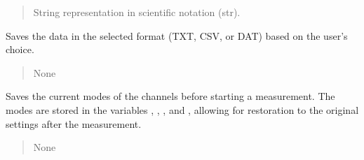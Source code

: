\documentclass[letterpaper,10pt,english]{sphinxmanual}
\begin{document}
\begin{fulllineitems}
\begin{fulllineitems}
\begin{quote}
\begin{description}
\sphinxAtStartPar
String representation in scientific notation (str).

\end{description}\end{quote}

\end{fulllineitems}


\begin{fulllineitems}
\label{\detokenize{FLIMGraphics:FLIMGraphics.FLIMGraphic.saveFLIMData}}
\pysigstartsignatures
{}
\pysigstopsignatures
\sphinxAtStartPar
Saves the data in the selected format (TXT, CSV, or DAT) based on the user’s choice.
\begin{quote}\begin{description}
\sphinxAtStartPar
None

\end{description}\end{quote}

\end{fulllineitems}


\begin{fulllineitems}
\label{\detokenize{FLIMGraphics:FLIMGraphics.FLIMGraphic.saveMode}}
\pysigstartsignatures
{}
\pysigstopsignatures
\sphinxAtStartPar
Saves the current modes of the channels before starting a measurement.
The modes are stored in the variables , , 
, and , allowing for restoration to the original settings after the measurement.
\begin{quote}\begin{description}
\sphinxAtStartPar
None

\end{description}\end{quote}

\end{fulllineitems}



\end{fulllineitems}
\end{document}
